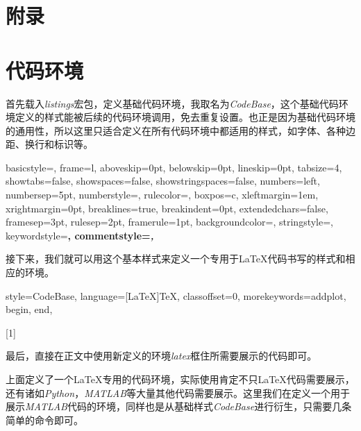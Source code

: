 \section{附录}

\section{代码环境}

首先载入\emph{listings}宏包，定义基础代码环境，我取名为\emph{CodeBase}，这个基础代码环境定义的样式能被后续的代码环境调用，免去重复设置。也正是因为基础代码环境的通用性，所以这里只适合定义在所有代码环境中都适用的样式，如字体、各种边距、换行和标识等。

\begin{latex}
{
    basicstyle=\small\ttfamily,
    frame=l,
    aboveskip=0pt,%
    belowskip=0pt,%
    lineskip=0pt,
    tabsize=4,%
    showtabs=false,%
    showspaces=false,%
    showstringspaces=false,
    numbers=left,
    numbersep=5pt,%
    numberstyle=\small\ttfamily,
    rulecolor=\color{cyan},
    boxpos=c,
    xleftmargin=1em,%
    xrightmargin=0pt,
    breaklines=true,%
    breakindent=0pt,%
    extendedchars=false,%
    framesep=3pt,
    rulesep=2pt,
    framerule=1pt,
    backgroundcolor=\color{gray!5},
    stringstyle=\color{green!40!black!100},
    keywordstyle=\bfseries\color[RGB]{0,0,255},
    commentstyle=\slshape\color{black!60},
}
\end{latex}

接下来，我们就可以用这个基本样式来定义一个专用于\LaTeX 代码书写的样式和相应的环境。

\begin{latex}
{
    style=CodeBase,
    language=[LaTeX]TeX,
    classoffset=0,
    morekeywords={addplot, begin, end},
}

[1]{\lstset{style=LaTeX}}{}
\end{latex}

最后，直接在正文中使用新定义的环境\emph{latex}框住所需要展示的代码即可。

上面定义了一个\LaTeX 专用的代码环境，实际使用肯定不只\LaTeX 代码需要展示，还有诸如\emph{Python}，\emph{MATLAB}等大量其他代码需要展示。这里我们在定义一个用于展示\emph{MATLAB}代码的环境，同样也是从基础样式\emph{CodeBase}进行衍生，只需要几条简单的命令即可。

